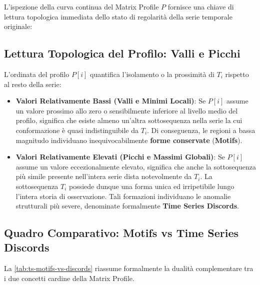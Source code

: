 L'ispezione della curva continua del Matrix Profile $P$ fornisce una chiave di lettura topologica immediata dello stato di regolarit\`a della serie temporale originale:

\FloatBarrier
\subsection{Lettura Topologica del Profilo: Valli e Picchi}
\label{subsec:ts-topological-reading}

L'ordinata del profilo $P[i]$ quantifica l'isolamento o la prossimit\`a di $T_i$ rispetto al resto della serie:

\begin{itemize}
    \item \textbf{Valori Relativamente Bassi (Valli e Minimi Locali)}:
    Se $P[i]$ assume un valore prossimo allo zero o sensibilmente inferiore al livello medio del profilo, significa che esiste almeno un'altra sottosequenza nella serie la cui conformazione \`e quasi indistinguibile da $T_i$. Di conseguenza, le regioni a bassa magnitudo individuano inequivocabilmente \textbf{forme conservate} (\textbf{Motifs}).
    
    \item \textbf{Valori Relativamente Elevati (Picchi e Massimi Globali)}:
    Se $P[i]$ assume un valore eccezionalmente elevato, significa che anche la sottosequenza pi\`u simile presente nell'intera serie dista notevolmente da $T_i$. La sottosequenza $T_i$ possiede dunque una forma unica ed irripetibile lungo l'intera storia di osservazione. Tali formazioni individuano le anomalie strutturali pi\`u severe, denominate formalmente \textbf{Time Series Discords}.
\end{itemize}

\FloatBarrier
\subsection{Quadro Comparativo: Motifs vs Time Series Discords}
\label{subsec:ts-comparison-motifs-discords}

La \autoref{tab:ts-motifs-vs-discords} riassume formalmente la dualit\`a complementare tra i due concetti cardine della Matrix Profile.

